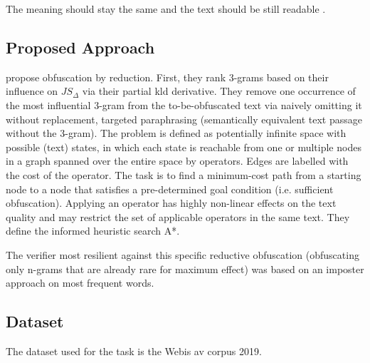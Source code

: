 \begin{definition}
    [Paraphrase]
    The meaning should stay the same and the text should be still readable \cite{bevendorff_divergence_based_2020}.
\end{definition}

\subsection{Proposed Approach}
\citet{bevendorff_divergence_based_2020} propose obfuscation by reduction.
First, they rank 3-grams based on their influence on $JS_\Delta$ via their partial \ac{kld} derivative.
They remove one occurrence of the most influential 3-gram from the to-be-obfuscated text via naively omitting it without replacement, 
targeted paraphrasing (semantically equivalent text passage without the 3-gram).
The problem is defined as potentially infinite space with possible (text) states, 
in which each state is reachable from one or multiple nodes in a graph spanned over the entire space by operators.
Edges are labelled with the cost of the operator.
The task is to find a minimum-cost path from a starting node to a node that satisfies a pre-determined goal condition 
(i.e. sufficient obfuscation).
Applying an operator has highly non-linear effects on the text quality and may restrict the set of applicable operators in the same text.
They define the informed heuristic search A*.

The verifier most resilient against this specific reductive obfuscation (obfuscating only n-grams that are already rare for maximum effect) 
was based on an imposter approach on most frequent words.

\subsection{Dataset}
The dataset used for the task is the Webis \acl{av} corpus 2019.